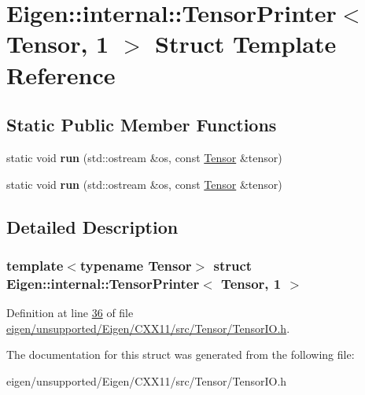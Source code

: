 \hypertarget{struct_eigen_1_1internal_1_1_tensor_printer_3_01_tensor_00_011_01_4}{}\section{Eigen\+:\+:internal\+:\+:Tensor\+Printer$<$ Tensor, 1 $>$ Struct Template Reference}
\label{struct_eigen_1_1internal_1_1_tensor_printer_3_01_tensor_00_011_01_4}
\subsection*{Static Public Member Functions}
\begin{DoxyCompactItemize}
\item 
\mbox{\label{struct_eigen_1_1internal_1_1_tensor_printer_3_01_tensor_00_011_01_4_a0937497ab765508ea5720dbd71c016c0}} 
static void {\bfseries run} (std\+::ostream \&os, const \hyperlink{class_eigen_1_1_tensor}{Tensor} \&tensor)
\item 
\mbox{\label{struct_eigen_1_1internal_1_1_tensor_printer_3_01_tensor_00_011_01_4_a0937497ab765508ea5720dbd71c016c0}} 
static void {\bfseries run} (std\+::ostream \&os, const \hyperlink{class_eigen_1_1_tensor}{Tensor} \&tensor)
\end{DoxyCompactItemize}


\subsection{Detailed Description}
\subsubsection*{template$<$typename Tensor$>$\newline
struct Eigen\+::internal\+::\+Tensor\+Printer$<$ Tensor, 1 $>$}



Definition at line \hyperlink{eigen_2unsupported_2_eigen_2_c_x_x11_2src_2_tensor_2_tensor_i_o_8h_source_l00036}{36} of file \hyperlink{eigen_2unsupported_2_eigen_2_c_x_x11_2src_2_tensor_2_tensor_i_o_8h_source}{eigen/unsupported/\+Eigen/\+C\+X\+X11/src/\+Tensor/\+Tensor\+I\+O.\+h}.



The documentation for this struct was generated from the following file\+:\begin{DoxyCompactItemize}
\item 
eigen/unsupported/\+Eigen/\+C\+X\+X11/src/\+Tensor/\+Tensor\+I\+O.\+h\end{DoxyCompactItemize}
